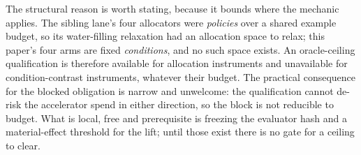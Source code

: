 The structural reason is worth stating, because it bounds where the mechanic applies. The sibling lane's four allocators were \emph{policies} over a shared example budget, so its water-filling relaxation had an allocation space to relax; this paper's four arms are fixed \emph{conditions}, and no such space exists. An oracle-ceiling qualification is therefore available for allocation instruments and unavailable for condition-contrast instruments, whatever their budget. The practical consequence for the blocked obligation is narrow and unwelcome: the qualification cannot de-risk the accelerator spend in either direction, so the block is not reducible to budget. What is local, free and prerequisite is freezing the evaluator hash and a material-effect threshold for the lift; until those exist there is no gate for a ceiling to clear.
